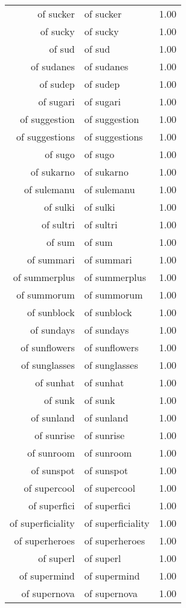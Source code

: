 \begin{table}[ht]
\begin{tabular}{rlr}
  of sucker & of sucker & 1.00 \\ 
  of sucky & of sucky & 1.00 \\ 
  of sud & of sud & 1.00 \\ 
  of sudanes & of sudanes & 1.00 \\ 
  of sudep & of sudep & 1.00 \\ 
  of sugari & of sugari & 1.00 \\ 
  of suggestion & of suggestion & 1.00 \\ 
  of suggestions & of suggestions & 1.00 \\ 
  of sugo & of sugo & 1.00 \\ 
  of sukarno & of sukarno & 1.00 \\ 
  of sulemanu & of sulemanu & 1.00 \\ 
  of sulki & of sulki & 1.00 \\ 
  of sultri & of sultri & 1.00 \\ 
  of sum & of sum & 1.00 \\ 
  of summari & of summari & 1.00 \\ 
  of summerplus & of summerplus & 1.00 \\ 
  of summorum & of summorum & 1.00 \\ 
  of sunblock & of sunblock & 1.00 \\ 
  of sundays & of sundays & 1.00 \\ 
  of sunflowers & of sunflowers & 1.00 \\ 
  of sunglasses & of sunglasses & 1.00 \\ 
  of sunhat & of sunhat & 1.00 \\ 
  of sunk & of sunk & 1.00 \\ 
  of sunland & of sunland & 1.00 \\ 
  of sunrise & of sunrise & 1.00 \\ 
  of sunroom & of sunroom & 1.00 \\ 
  of sunspot & of sunspot & 1.00 \\ 
  of supercool & of supercool & 1.00 \\ 
  of superfici & of superfici & 1.00 \\ 
  of superficiality & of superficiality & 1.00 \\ 
  of superheroes & of superheroes & 1.00 \\ 
  of superl & of superl & 1.00 \\ 
  of supermind & of supermind & 1.00 \\ 
  of supernova & of supernova & 1.00 \\ 

\end{tabular}
\end{table}
